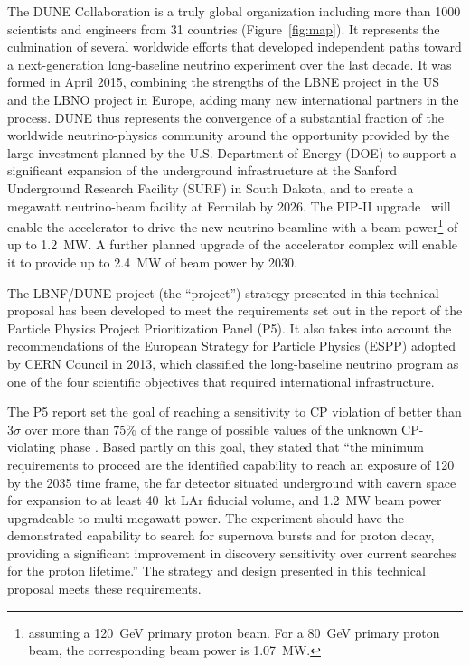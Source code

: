 The DUNE Collaboration is a truly global organization including more than 1000 scientists and engineers from 31 countries (Figure~\ref{fig:map}). It represents
the culmination of several worldwide efforts that developed independent paths toward a next-generation long-baseline neutrino experiment over the last decade.
It was formed in April 2015, combining the strengths of the LBNE project in the US and the LBNO project in Europe, adding many new international 
partners in the process. DUNE thus represents the convergence of a substantial fraction of the worldwide neutrino-physics community around the 
opportunity provided by the large investment planned by the U.S. Department of Energy (DOE) to support 
a significant expansion of the underground infrastructure at the Sanford Underground Research 
Facility (SURF) in South Dakota, and to create a megawatt neutrino-beam facility at Fermilab by 2026. 
The PIP-II upgrade~\cite{pip2-2013}
will enable the accelerator to drive the new neutrino beamline with a beam power\footnote{assuming a \SI{120}{\GeV} primary proton beam. 
For a \SI{80}{\GeV} primary proton beam, the corresponding beam power is \SI{1.07}{\MW}.} of up to \SI{1.2}{\MW}. A further planned upgrade 
of the accelerator complex will enable it to provide up to \SI{2.4}{\MW} of beam power by 2030.  

The LBNF/DUNE project (the ``project'') strategy presented in this technical proposal has been developed to meet the requirements set out in the report of the Particle Physics Project Prioritization Panel (P5). It also takes into account the recommendations of the European Strategy for Particle  Physics (ESPP) adopted by CERN Council in 2013, which classified the long-baseline neutrino program as one of the four scientific objectives that required international infrastructure.

The P5 report set the goal of reaching a sensitivity to CP violation of better than 3$\sigma$ over more than $75\%$ 
of the range of possible values of the unknown CP-violating phase \deltacp.
Based partly on this goal, they stated that ``the 
minimum requirements to proceed are the identified capability to reach an exposure 
of \num{120}~\ktMWyr{} by the 2035 time frame, the far detector situated underground 
with cavern space for expansion to at least 40~kt LAr fiducial volume, and 1.2~MW 
beam power upgradeable to multi-megawatt power.
The experiment should have the demonstrated 
capability to search for supernova bursts and for proton decay, providing a significant 
improvement in discovery sensitivity over current searches for the proton lifetime.'' The strategy and design presented in this technical proposal meets these requirements.

